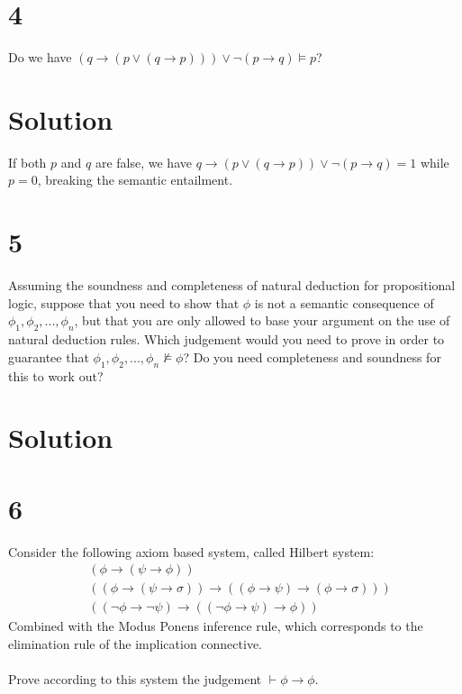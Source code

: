 \documentclass[10pt]{article}
\begin{document}
\section*{4}

Do we have $ (q\to (p\lor (q\to p))) \lor \lnot(p\to q) \models p$?

\section*{Solution}

If both $p$ and $q$ are false, we have $q\to (p \lor (q\to p)) \lor \lnot (p \to q) = 1$ while $p=0$, breaking the semantic entailment.

\section*{5}

Assuming the soundness and completeness of natural deduction for propositional logic, suppose that you need to show that $\phi$ is not a semantic consequence of $\phi _1, \phi _2, ..., \phi _n$, but that you are only allowed to base your argument on the use of natural deduction rules. Which judgement would you need to prove in order to guarantee that $\phi _1, \phi _2, ..., \phi _n \not\models \phi$? Do you need completeness and soundness for this to work out?

\section*{Solution}


\section*{6}

Consider the following axiom based system, called Hilbert system:
\begin{align*}
& (\phi \to (\psi \to \phi))\\
& ((\phi \to (\psi \to \sigma)) \to ((\phi \to \psi ) \to (\phi \to \sigma)))\\
& ((\lnot \phi \to \lnot \psi ) \to ((\lnot \phi \to \psi ) \to \phi ))
\end{align*}
Combined with the Modus Ponens inference rule, which corresponds to the elimination rule of the implication connective.\\\\
Prove according to this system the judgement $\vdash \phi \to \phi$.
\end{document}
